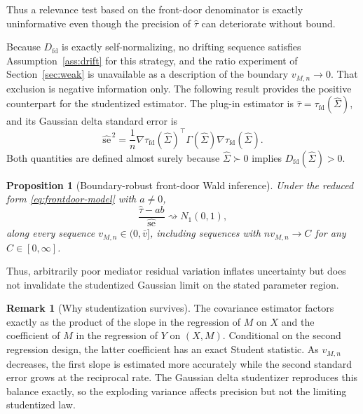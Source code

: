 \documentclass[12pt,a4paper]{article}
\theoremstyle{plain}
\newtheorem{proposition}{Proposition}
\theoremstyle{definition}
\newtheorem{remark}{Remark}
\newcommand{\dto}{\rightsquigarrow}
\newcommand{\Sighat}{\hat{\Sigma}}
\begin{document}
Thus a relevance test based on the front-door denominator is exactly uninformative even though the precision of $\hat{\tau}$ can deteriorate without bound.

Because $D_{\mathrm{fd}}$ is exactly self-normalizing, no drifting sequence satisfies Assumption~\ref{ass:drift} for this strategy, and the ratio experiment of Section~\ref{sec:weak} is unavailable as a description of the boundary $v_{M,n}\to0$.
That exclusion is negative information only.
The following result provides the positive counterpart for the studentized estimator.
The plug-in estimator is $\hat{\tau}=\tau_{\mathrm{fd}}(\Sighat)$, and its Gaussian delta standard error is
\begin{equation}
\label{eq:frontdoor-delta-se}
    \widehat{\mathrm{se}}^{\,2}
    =
    \frac{1}{n}
    \nabla\tau_{\mathrm{fd}}(\Sighat)^\top
    \Gamma(\Sighat)
    \nabla\tau_{\mathrm{fd}}(\Sighat)
    .
\end{equation}
Both quantities are defined almost surely because $\Sighat\succ0$ implies $D_{\mathrm{fd}}(\Sighat)>0$.

\begin{proposition}[Boundary-robust front-door Wald inference]
\label{prop:frontdoor-boundary}
    Under the reduced form \eqref{eq:frontdoor-model} with $a\ne0$,
    \begin{equation}
    \label{eq:frontdoor-wald}
        \frac{\hat{\tau}-ab}{\widehat{\mathrm{se}}}
        \dto
        N_1(0,1)
        ,
    \end{equation}
    along every sequence $v_{M,n}\in(0,\bar{v}]$, including sequences with $nv_{M,n}\to C$ for any $C\in[0,\infty]$.
\end{proposition}

Thus, arbitrarily poor mediator residual variation inflates uncertainty but does not invalidate the studentized Gaussian limit on the stated parameter region.

\begin{remark}[Why studentization survives]
\label{rem:frontdoor-mechanism}
    The covariance estimator factors exactly as the product of the slope in the regression of $M$ on $X$ and the coefficient of $M$ in the regression of $Y$ on $(X,M)$.
    Conditional on the second regression design, the latter coefficient has an exact Student statistic.
    As $v_{M,n}$ decreases, the first slope is estimated more accurately while the second standard error grows at the reciprocal rate.
    The Gaussian delta studentizer reproduces this balance exactly, so the exploding variance affects precision but not the limiting studentized law.
\end{remark}
\end{document}
